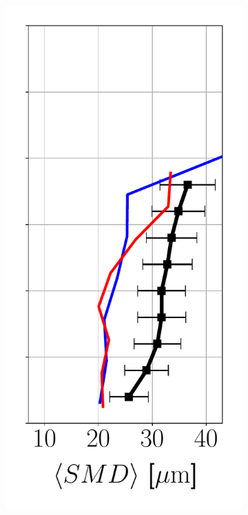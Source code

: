 \begin{figure}[h!]
\begin{subfigure}[b]{0.2\textwidth}
   \includegraphics[scale=0.35]{./part2_developments/figures_ch6_lagrangian_JICF/params_turb_injection/profiles/SMD_along_z}
\end{subfigure}
\hspace*{0.1in}

\end{figure}
